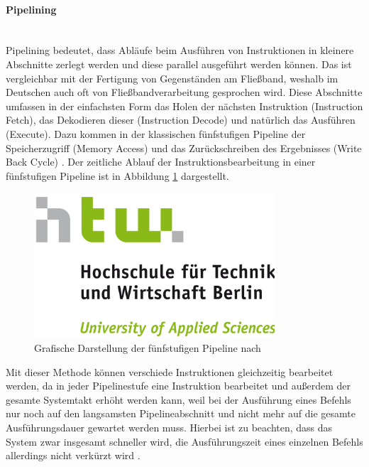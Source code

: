 \documentclass[11pt,a4paper,titlepage]{article}
\begin{document}
\paragraph{Pipelining}$\;$\\

Pipelining bedeutet, dass Abläufe beim Ausführen von Instruktionen in kleinere Abschnitte zerlegt werden und diese parallel ausgeführt werden können. Das ist vergleichbar mit der Fertigung von Gegenständen am Fließband, weshalb im Deutschen auch oft von Fließbandverarbeitung gesprochen wird. Diese Abschnitte umfassen in der einfachsten Form das Holen der nächsten Instruktion (Instruction Fetch), das Dekodieren dieser (Instruction Decode) und natürlich das Ausführen (Execute). Dazu kommen in der klassischen fünfstufigen Pipeline der Speicherzugriff (Memory Access) und das Zurückschreiben des Ergebnisses (Write Back Cycle) \cite[S. C-6]{Hennessy}. Der zeitliche Ablauf der Instruktionsbearbeitung in einer fünfstufigen Pipeline ist in Abbildung \ref{img:Pipeline} dargestellt.\\

\begin{figure}[!ht]
\centering
\includegraphics[width=0.8\textwidth]{images/htw_hochschule.png}
\caption{Grafische Darstellung der fünfstufigen Pipeline nach \cite[S. 24]{Furber}}
\label{img:Pipeline}
\end{figure}

Mit dieser Methode können verschiede Instruktionen gleichzeitig bearbeitet werden, da in jeder Pipelinestufe eine Instruktion bearbeitet und außerdem der gesamte Systemtakt erhöht werden kann, weil bei der Ausführung eines Befehls nur noch auf den langsamsten Pipelineabschnitt und nicht mehr auf die gesamte Ausführungsdauer gewartet werden muss. Hierbei ist zu beachten, dass das System zwar insgesamt schneller wird, die Ausführungszeit eines einzelnen Befehls allerdings nicht verkürzt wird \cite[S. C-10]{Hennessy}.
\end{document}
